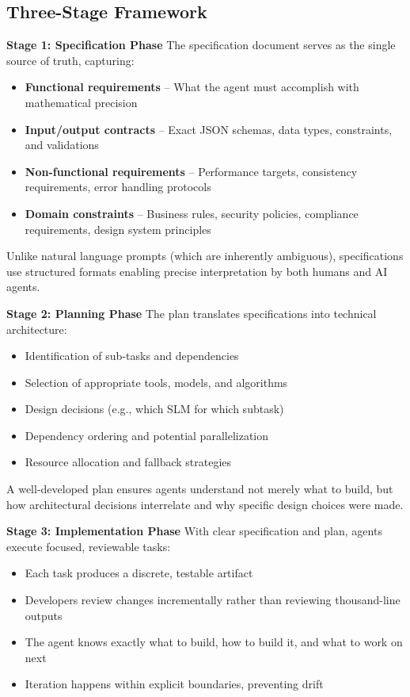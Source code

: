 \documentclass[11pt,a4paper]{article}
\begin{document}
\subsection{Three-Stage Framework}

\textbf{Stage 1: Specification Phase}
The specification document serves as the single source of truth, capturing:

\begin{itemize}
    \item \textbf{Functional requirements} -- What the agent must accomplish with mathematical precision
    \item \textbf{Input/output contracts} -- Exact JSON schemas, data types, constraints, and validations
    \item \textbf{Non-functional requirements} -- Performance targets, consistency requirements, error handling protocols
    \item \textbf{Domain constraints} -- Business rules, security policies, compliance requirements, design system principles \cite{jetbrains2025}
\end{itemize}
Unlike natural language prompts (which are inherently ambiguous), specifications use structured formats enabling precise interpretation by both humans and AI agents. \newline


\textbf{Stage 2: Planning Phase}
The plan translates specifications into technical architecture:
\begin{itemize}
    \item Identification of sub-tasks and dependencies
    \item Selection of appropriate tools, models, and algorithms
    \item Design decisions (e.g., which SLM for which subtask)
    \item Dependency ordering and potential parallelization
    \item Resource allocation and fallback strategies \cite{jetbrains2025}
\end{itemize}
A well-developed plan ensures agents understand not merely what to build, but how architectural decisions interrelate and why specific design choices were made.


\textbf{Stage 3: Implementation Phase}
With clear specification and plan, agents execute focused, reviewable tasks:
\begin{itemize}
    \item Each task produces a discrete, testable artifact
    \item Developers review changes incrementally rather than reviewing thousand-line outputs
    \item The agent knows exactly what to build, how to build it, and what to work on next \cite{jetbrains2025}
    \item Iteration happens within explicit boundaries, preventing drift
\end{itemize}
\end{document}
